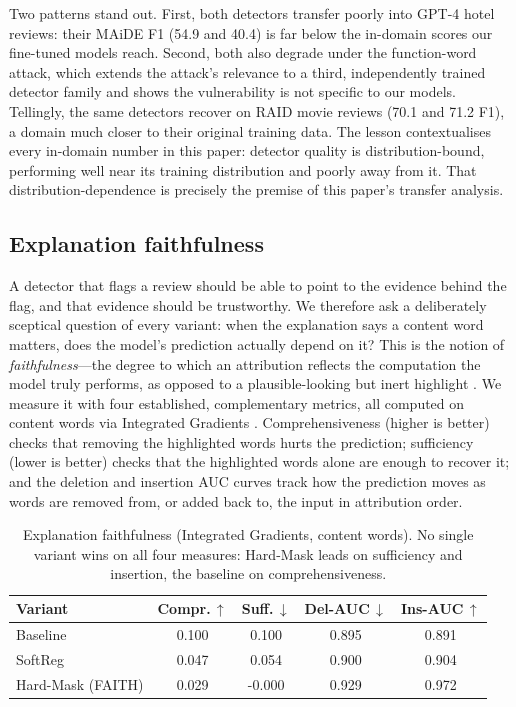 \documentclass[10pt,twocolumn]{article}
\begin{document}
Two patterns stand out. First, both detectors transfer poorly into GPT-4 hotel reviews: their MAiDE F1 (54.9 and 40.4) is far below the in-domain scores our fine-tuned models reach. Second, both also degrade under the function-word attack, which extends the attack's relevance to a third, independently trained detector family and shows the vulnerability is not specific to our models. Tellingly, the same detectors recover on RAID movie reviews (70.1 and 71.2 F1), a domain much closer to their original training data. The lesson contextualises every in-domain number in this paper: detector quality is distribution-bound, performing well near its training distribution and poorly away from it. That distribution-dependence is precisely the premise of this paper's transfer analysis.

\subsection{Explanation faithfulness}\label{sec:faith}
A detector that flags a review should be able to point to the evidence behind the flag, and that evidence should be trustworthy. We therefore ask a deliberately sceptical question of every variant: when the explanation says a content word matters, does the model's prediction actually depend on it? This is the notion of \emph{faithfulness}---the degree to which an attribution reflects the computation the model truly performs, as opposed to a plausible-looking but inert highlight \cite{jacovi}. We measure it with four established, complementary metrics, all computed on content words via Integrated Gradients \cite{ig}. Comprehensiveness (higher is better) checks that removing the highlighted words hurts the prediction; sufficiency (lower is better) checks that the highlighted words alone are enough to recover it; and the deletion and insertion AUC curves \cite{rise} track how the prediction moves as words are removed from, or added back to, the input in attribution order.

\begin{table}[tp]\centering
\caption{Explanation faithfulness (Integrated Gradients, content words). No single variant wins on all four measures: Hard-Mask leads on sufficiency and insertion, the baseline on comprehensiveness.}
\label{tab:faith}
\small
\begin{tabular}{lcccc}
\toprule
Variant & Compr.\,$\uparrow$ & Suff.\,$\downarrow$ & Del-AUC\,$\downarrow$ & Ins-AUC\,$\uparrow$ \\
\midrule
Baseline & 0.100 & 0.100 & 0.895 & 0.891 \\
SoftReg & 0.047 & 0.054 & 0.900 & 0.904 \\
Hard-Mask (FAITH) & 0.029 & -0.000 & 0.929 & 0.972 \\
\bottomrule
\end{tabular}
\end{table}
\end{document}

